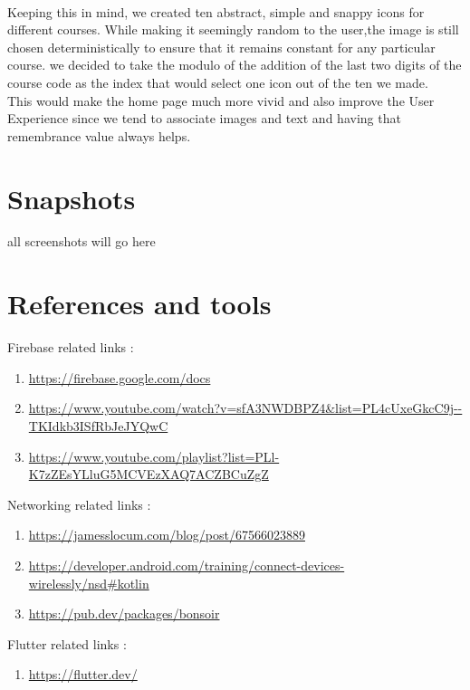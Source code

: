 \documentclass{article}
\begin{document}
\\Keeping this in mind, we created ten abstract, simple and snappy icons for different courses. While making it seemingly random to the user,the image is still chosen deterministically to ensure that it remains constant for any particular course. we decided to take the modulo of the addition of the last two digits of the course code as the index that would select one icon out of the ten we made. 
\\This would make the home page much more vivid and also improve the User Experience since we tend to associate images and text and having that remembrance value always helps.

\section{Snapshots}
all screenshots will go here

\section{References and tools}
Firebase related links :
\begin{enumerate}
    \item \url{https://firebase.google.com/docs}
    \item \url{https://www.youtube.com/watch?v=sfA3NWDBPZ4&list=PL4cUxeGkcC9j--TKIdkb3ISfRbJeJYQwC}
    \item \url{https://www.youtube.com/playlist?list=PLl-K7zZEsYLluG5MCVEzXAQ7ACZBCuZgZ}
\end{enumerate}
Networking related links :
\begin{enumerate}
    \item \url{https://jamesslocum.com/blog/post/67566023889}
    \item \url{https://developer.android.com/training/connect-devices-wirelessly/nsd#kotlin}
    \item \url{https://pub.dev/packages/bonsoir}
\end{enumerate}
Flutter related links :
\begin{enumerate}
    \item \url{https://flutter.dev/}
\end{enumerate}
\end{document}
